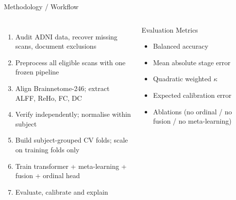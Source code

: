 \documentclass[aspectratio=169,11pt]{beamer}
\begin{document}
\begin{frame}{Methodology / Workflow}
  \begin{columns}[T,onlytextwidth]
      \small
      \begin{enumerate}
        \item Audit ADNI data, recover missing scans, document exclusions
        \item Preprocess all eligible scans with one frozen pipeline
        \item Align Brainnetome-246; extract ALFF, ReHo, FC, DC
        \item Verify independently; normalise within subject
        \item Build subject-grouped CV folds; scale on training folds only
        \item Train transformer + meta-learning + fusion + ordinal head
        \item Evaluate, calibrate and explain
      \end{enumerate}
      \begin{block}{Evaluation Metrics}
        \small
        \begin{itemize}
          \item Balanced accuracy
          \item Mean absolute stage error
          \item Quadratic weighted $\kappa$
          \item Expected calibration error
          \item Ablations (no ordinal / no fusion / no meta-learning)
        \end{itemize}
      \end{block}
  \end{columns}
\end{frame}
\end{document}
